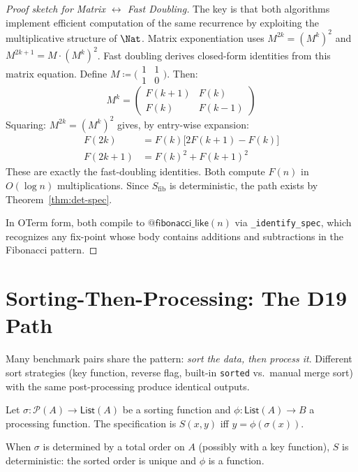 \begin{proof}[Proof sketch for Matrix $\leftrightarrow$ Fast Doubling]
The key is that both algorithms implement efficient computation of
the same recurrence by exploiting the multiplicative structure of
$\Nat$.  Matrix exponentiation uses
$M^{2k} = (M^k)^2$ and $M^{2k+1} = M \cdot (M^k)^2$.
Fast doubling derives closed-form identities from this matrix
equation.  Define $M \coloneqq
\bigl(\begin{smallmatrix}1&1\\1&0\end{smallmatrix}\bigr)$.
Then:
\[
  M^k = \begin{pmatrix} F(k{+}1) & F(k) \\ F(k) & F(k{-}1)
  \end{pmatrix}
\]
Squaring: $M^{2k} = (M^k)^2$ gives, by entry-wise expansion:
\begin{align*}
  F(2k) &= F(k)\bigl[2F(k{+}1) - F(k)\bigr] \\
  F(2k{+}1) &= F(k)^2 + F(k{+}1)^2
\end{align*}
These are exactly the fast-doubling identities.  Both compute
$F(n)$ in $O(\log n)$ multiplications.  Since $S_{\mathrm{fib}}$
is deterministic, the path exists by Theorem~\ref{thm:det-spec}.

In OTerm form, both compile to $\mathsf{@fibonacci\_like}(n)$ via
\texttt{\_identify\_spec}, which recognizes any fix-point whose
body contains additions and subtractions in the Fibonacci pattern.
\end{proof}

\section{Sorting-Then-Processing: The D19 Path}
\label{sec:sort-process}

Many benchmark pairs share the pattern: \emph{sort the data, then
process it}.  Different sort strategies (key function, reverse flag,
built-in \texttt{sorted} vs.\ manual merge sort) with the same
post-processing produce identical outputs.

\begin{definition}
Let $\sigma : \mathcal{P}(A) \to \mathsf{List}(A)$ be a sorting
function and $\phi : \mathsf{List}(A) \to B$ a processing function.
The specification is $S(x, y)$ iff $y = \phi(\sigma(x))$.

When $\sigma$ is determined by a total order on $A$ (possibly
with a key function), $S$ is deterministic: the sorted order is
unique and $\phi$ is a function.
\end{definition}

